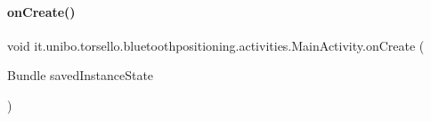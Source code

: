 \hypertarget{classit_1_1unibo_1_1torsello_1_1bluetoothpositioning_1_1activities_1_1MainActivity_a8ffa5fa91fb4ae13a758a12682872a79_a8ffa5fa91fb4ae13a758a12682872a79}{}\label{classit_1_1unibo_1_1torsello_1_1bluetoothpositioning_1_1activities_1_1MainActivity_a8ffa5fa91fb4ae13a758a12682872a79_a8ffa5fa91fb4ae13a758a12682872a79} 
\paragraph{\texorpdfstring{on\+Create()}{onCreate()}}
{\footnotesize\ttfamily void it.\+unibo.\+torsello.\+bluetoothpositioning.\+activities.\+Main\+Activity.\+on\+Create (\begin{DoxyParamCaption}\item[{Bundle}]{saved\+Instance\+State }\end{DoxyParamCaption})\hspace{0.3cm}{\ttfamily [protected]}}


